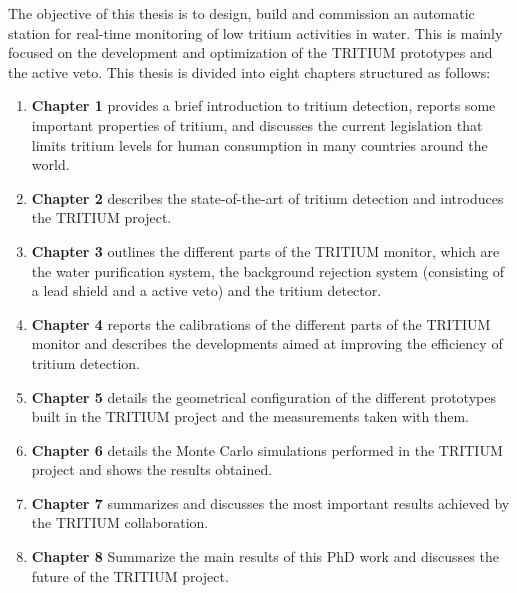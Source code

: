 The objective of this thesis is to design, build and commission an automatic station for real-time monitoring of low tritium activities in water. This is mainly focused on the development and optimization of the TRITIUM prototypes and the active veto. This thesis is divided into eight chapters structured as follows:

\begin{enumerate}
\item{} \textbf{Chapter 1} provides a brief introduction to tritium detection, reports some important properties of tritium, and discusses the current legislation that limits tritium levels for human consumption in many countries around the world. 

\item{} \textbf{Chapter 2} describes the state-of-the-art of tritium detection and introduces the TRITIUM project. 

\item{} \textbf{Chapter 3} outlines the different parts of the TRITIUM monitor, which are the water purification system, the background rejection system (consisting of a lead shield and a active veto)  and the tritium detector. 

\item{} \textbf{Chapter 4} reports the calibrations of the different parts of the TRITIUM monitor and describes the developments aimed at improving the efficiency of tritium detection. 

\item{} \textbf{Chapter 5} details the geometrical configuration of the different prototypes built in the TRITIUM project and the measurements taken with them. 

\item{} \textbf{Chapter 6} details the Monte Carlo simulations performed in the TRITIUM project and shows the results obtained. 

\item{} \textbf{Chapter 7} summarizes and discusses the most important results achieved by the TRITIUM collaboration.

\item{} \textbf{Chapter 8} Summarize the main results of this PhD work and discusses the future of the TRITIUM project.

\end{enumerate}

